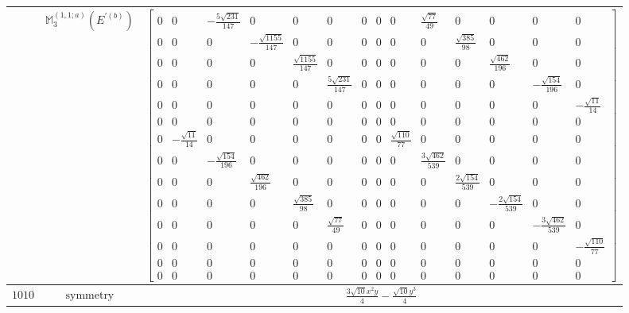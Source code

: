 \documentclass[fleqn,8pt,landscape]{jsarticle}
\begin{document}
\begin{longtable}{ccc}
$  $ & $ \mathbb{M}_{3}^{(1,1;a)}(E^{\prime(b)}) $ & $ \begin{bmatrix} 0 & 0 & - \frac{5 \sqrt{231}}{147} & 0 & 0 & 0 & 0 & 0 & 0 & \frac{\sqrt{77}}{49} & 0 & 0 & 0 & 0 \\ 0 & 0 & 0 & - \frac{\sqrt{1155}}{147} & 0 & 0 & 0 & 0 & 0 & 0 & \frac{\sqrt{385}}{98} & 0 & 0 & 0 \\ 0 & 0 & 0 & 0 & \frac{\sqrt{1155}}{147} & 0 & 0 & 0 & 0 & 0 & 0 & \frac{\sqrt{462}}{196} & 0 & 0 \\ 0 & 0 & 0 & 0 & 0 & \frac{5 \sqrt{231}}{147} & 0 & 0 & 0 & 0 & 0 & 0 & - \frac{\sqrt{154}}{196} & 0 \\ 0 & 0 & 0 & 0 & 0 & 0 & 0 & 0 & 0 & 0 & 0 & 0 & 0 & - \frac{\sqrt{11}}{14} \\ 0 & 0 & 0 & 0 & 0 & 0 & 0 & 0 & 0 & 0 & 0 & 0 & 0 & 0 \\ 0 & - \frac{\sqrt{11}}{14} & 0 & 0 & 0 & 0 & 0 & 0 & \frac{\sqrt{110}}{77} & 0 & 0 & 0 & 0 & 0 \\ 0 & 0 & - \frac{\sqrt{154}}{196} & 0 & 0 & 0 & 0 & 0 & 0 & \frac{3 \sqrt{462}}{539} & 0 & 0 & 0 & 0 \\ 0 & 0 & 0 & \frac{\sqrt{462}}{196} & 0 & 0 & 0 & 0 & 0 & 0 & \frac{2 \sqrt{154}}{539} & 0 & 0 & 0 \\ 0 & 0 & 0 & 0 & \frac{\sqrt{385}}{98} & 0 & 0 & 0 & 0 & 0 & 0 & - \frac{2 \sqrt{154}}{539} & 0 & 0 \\ 0 & 0 & 0 & 0 & 0 & \frac{\sqrt{77}}{49} & 0 & 0 & 0 & 0 & 0 & 0 & - \frac{3 \sqrt{462}}{539} & 0 \\ 0 & 0 & 0 & 0 & 0 & 0 & 0 & 0 & 0 & 0 & 0 & 0 & 0 & - \frac{\sqrt{110}}{77} \\ 0 & 0 & 0 & 0 & 0 & 0 & 0 & 0 & 0 & 0 & 0 & 0 & 0 & 0 \\ 0 & 0 & 0 & 0 & 0 & 0 & 0 & 0 & 0 & 0 & 0 & 0 & 0 & 0 \end{bmatrix} $ \\ \hline
$ 1010 $ & $ \text{symmetry} $ & $ \frac{3 \sqrt{10} x^{2} y}{4} - \frac{\sqrt{10} y^{3}}{4} $ \\

\end{longtable}
\end{document}
